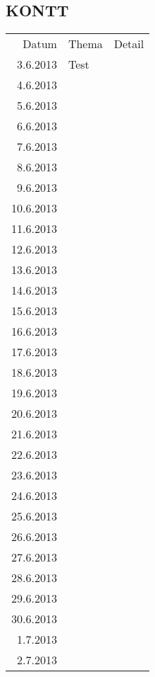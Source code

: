 \subsection{KONTT}
\begin{tabular}{r l p{}}
\rowcolor{lgray} Datum     & Thema         & Detail \\
\rowcolor{white}  3.6.2013 & Test          &  \\
\rowcolor{lgray}  4.6.2013 &               &  \\
\rowcolor{white}  5.6.2013 &               &  \\
\rowcolor{lgray}  6.6.2013 &               &  \\
\rowcolor{white}  7.6.2013 &               &  \\
\rowcolor{lgray}  8.6.2013 &               &  \\
\rowcolor{white}  9.6.2013 &               &  \\
\rowcolor{lgray} 10.6.2013 &               &  \\
\rowcolor{white} 11.6.2013 &               &  \\
\rowcolor{lgray} 12.6.2013 &               &  \\
\rowcolor{white} 13.6.2013 &               &  \\
\rowcolor{lgray} 14.6.2013 &               &  \\
\rowcolor{white} 15.6.2013 &               &  \\
\rowcolor{lgray} 16.6.2013 &               &  \\
\rowcolor{white} 17.6.2013 &               &  \\
\rowcolor{lgray} 18.6.2013 &               &  \\
\rowcolor{white} 19.6.2013 &               &  \\
\rowcolor{lgray} 20.6.2013 &               &  \\
\rowcolor{white} 21.6.2013 &               &  \\
\rowcolor{lgray} 22.6.2013 &               &  \\
\rowcolor{white} 23.6.2013 &               &  \\
\rowcolor{lgray} 24.6.2013 &               &  \\
\rowcolor{white} 25.6.2013 &               &  \\
\rowcolor{lgray} 26.6.2013 &               &  \\
\rowcolor{white} 27.6.2013 &               &  \\
\rowcolor{lgray} 28.6.2013 &               &  \\
\rowcolor{white} 29.6.2013 &               &  \\
\rowcolor{lgray} 30.6.2013 &               &  \\
\rowcolor{white}  1.7.2013 &               &  \\
\rowcolor{lgray}  2.7.2013 &               &  \\
\end{tabular}

